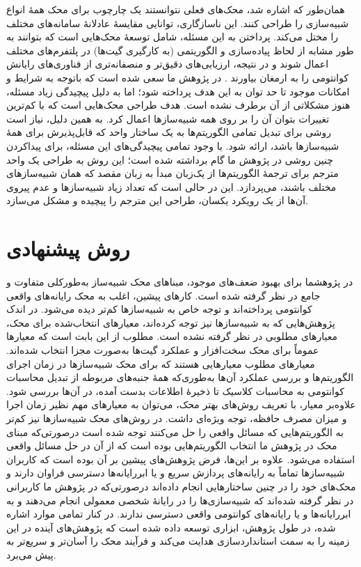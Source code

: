 همان‌طور که اشاره شد، محک‌های فعلی نتوانستند یک چارچوب برای محک همهٔ انواع شبیه‌سازی را طراحی کنند. این ناسازگاری، توانایی مقایسهٔ عادلانهٔ سامانه‌های مختلف را مختل می‌کند. پرداختن به این مسئله، شامل توسعهٔ محک‌هایی است که بتوانند به طور مشابه از لحاظ پیاده‌سازی و الگوریتمی (به کارگیری گیت‌ها) در پلتفرم‌های مختلف اعمال شوند و در نتیجه، ارزیابی‌های دقیق‌تر و منصفانه‌تری از فناوری‌های رایانش کوانتومی را به ارمغان بیاورند
 \cite{lubinski_application-oriented_2023}.
در پژوهش ما سعی شده است که باتوجه‌ به شرایط و امکانات موجود تا حد توان به این هدف پرداخته شود؛ اما به دلیل پیچیدگی زیاد مسئله، هنوز مشکلاتی از آن برطرف نشده است. هدف طراحی محک‌هایی است که با کم‌ترین تغییرات بتوان آن را بر روی همه شبیه‌سازها اعمال کرد. به همین دلیل، نیاز است روشی برای تبدیل تمامی الگوریتم‌ها به یک ساختار واحد که قابل‌پذیرش برای همهٔ شبیه‌سازها باشد، ارائه شود. با وجود تمامی پیچیدگی‌های این مسئله، برای پیداکردن چنین روشی در پژوهش ما گام برداشته شده است؛ این روش به طراحی یک واحد مترجم برای ترجمهٔ الگوریتم‌ها از یک‌زبان مبدأ به زبان مقصد که همان شبیه‌سازهای مختلف باشند، می‌پردازد. این در حالی است که تعداد زیاد شبیه‌سازها و عدم پیروی آن‌ها از یک رویکرد یکسان، طراحی این مترجم را پیچیده و مشکل می‌سازد.

\section{روش پیشنهادی}
در پژوهشما برای بهبود ضعف‌های موجود، مبناهای محک شبیه‌ساز به‌طورکلی متفاوت و جامع در نظر گرفته شده است. کارهای پیشین، اغلب به محک رایانه‌های واقعی کوانتومی پرداخته‌اند و توجه خاص به شبیه‌سازها کم‌تر دیده می‌شود. در اندک پژوهش‌هایی که به شبیه‌سازها نیز توجه کرده‌اند، معیارهای انتخاب‌شده برای محک، معیارهای مطلوبی در نظر گرفته نشده است. مطلوب از این بابت است که معیارها عموماً برای محک سخت‌افزار و عملکرد گیت‌ها به‌صورت مجزا انتخاب شده‌اند. معیارهای مطلوب معیارهایی هستند که برای محک شبیه‌سازها در زمان اجرای الگوریتم‌ها و بررسی عملکرد آن‌ها به‌طوری‌که همهٔ جنبه‌های مربوطه از تبدیل محاسبات کوانتومی به محاسبات کلاسیک تا ذخیره‌ٔ اطلاعات بدست آمده، در آن‌ها بررسی شود. علاوه‌بر معیار، با تعریف روش‌های بهتر محک، می‌توان به معیارهای مهم نظیر زمان اجرا و میزان مصرف حافظه، توجه ویژه‌ای داشت. در روش‌های محک شبیه‌سازها نیز کم‌تر به الگوریتم‌هایی که مسائل واقعی را حل می‌کنند توجه شده است درصورتی‌که مبنای محک در پژوهش ما انتخاب الگوریتم‌هایی بوده است که از آن در حل مسائل واقعی استفاده می‌شود. علاوه بر این‌ها، فرض پژوهش‌های پیشین بر آن بوده است که کاربران شبیه‌سازها تماماً به رایانه‌های پردازش سریع و یا ابررایانه‌ها دسترسی فراوان دارند و محک‌های خود را در چنین ساختارهایی انجام داده‌اند درصورتی‌که در پژوهش ما کاربرانی در نظر گرفته شده‌اند که شبیه‌سازی‌ها را در رایانهٔ شخصی معمولی انجام می‌دهند و به ابررایانه‌ها و یا رایانه‌های کوانتومی واقعی دسترسی ندارند. در کنار تمامی موارد اشاره شده، در طول پژوهش، ابزاری توسعه داده شده است که پژوهش‌های آینده در این زمینه را به سمت استانداردسازی هدایت می‌کند و فرآیند محک را آسان‌تر و سریع‌تر به پیش می‌برد.


